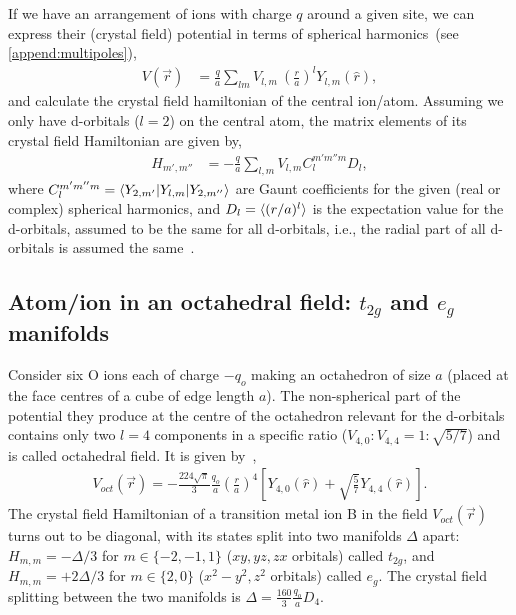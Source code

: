 \documentclass[a4paper,prb,twocolumn]{revtex4-1}  %
\newcommand{\ylm}[1]{Y_{#1}(\hat r)}
\begin{document}
If we have an arrangement of ions with charge $q$ around a given site,
we can express their (crystal field) potential in terms of spherical harmonics~(see \ref{append:multipoles}), 
\begin{align}
V(\vec r) &= \frac{q}{a}\sum_{lm}V_{l,m}~\left(\frac{r}{a}\right)^l \ylm{l,m},
\end{align}
and calculate the crystal field hamiltonian of the central ion/atom.
Assuming we only have d-orbitals ($l=2$) on the central atom,
the matrix elements of its crystal field Hamiltonian
are given by,
\begin{align}
H_{m',m''} &= -\frac{q}{a}\sum_{l,m} V_{l,m} C_{l}^{m'm''m} D_{l} ,
\end{align}
where 
$C_{l}^{m'm''m}=\braket{Y_{2,m'}| Y_{l,m}| Y_{2,m''}}$ are Gaunt coefficients for the given (real or complex) spherical harmonics,
and $D_{l}=\braket{(r/a)^l}$ is the expectation value for the d-orbitals, assumed to be the same for all d-orbitals, i.e., the radial part of all d-orbitals is assumed the same~\cite{PaxtonNotes}.

\subsection{Atom/ion in an octahedral field: $t_{2g}$  and $e_g$ manifolds}
\label{sec:egt2g}
Consider six O ions each of charge $-q_o$ making an octahedron of size $a$ (placed at the face centres of a cube of edge length $a$).
The non-spherical part of the potential they
 produce at the centre of the octahedron
 relevant for the d-orbitals contains 
 only two $l=4$ components
  in a specific ratio (${V_{4,0}:V_{4,4}=1:\sqrt{5/7}}$)
 and is called octahedral field. 
It is given by~\cite{PavariniChap},
\begin{align}
\label{eq:voct}
V_{oct}(\vec r) = -\frac{224\sqrt{\pi}}{3}\frac{q_o}{a} \left(\frac{r}{a}\right)^4\left[\ylm{4,0}+\sqrt{\frac{5}{7}}\ylm{4,4} \right].
\end{align}
The crystal field Hamiltonian of a transition metal ion B 
in the field $V_{oct}(\vec r)$
turns out to be diagonal,
with its states split into two manifolds $\Delta$ apart:
$H_{m,m} = -\Delta/3$ for $m\in\{-2,-1,1\}$ ($xy,yz,zx$ orbitals)
called $t_{2g}$,
and 
$H_{m,m} = +2\Delta/3$ for $m\in\{2,0\}$ ($x^2-y^2,z^2$ orbitals)
called $e_g$.
The crystal field splitting between the two manifolds is
${\Delta=\frac{160}{3}\frac{q_o}{a} D_{4}}$.
\end{document}
